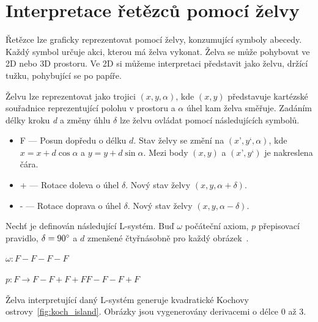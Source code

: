 \documentclass[thesis=M,czech]{FITthesis}[2019/12/23]
\begin{document}
\section{Interpretace řetězců pomocí želvy}
Řetězce lze graficky reprezentovat pomocí želvy, konzumující symboly abecedy. Každý symbol určuje akci, kterou má želva vykonat. Želva se může pohybovat ve 2D nebo 3D prostoru. Ve 2D si můžeme interpretaci představit jako želvu, držící tužku, pohybující se po papíře.

Želvu lze reprezentovat jako trojici $(x, y, \alpha)$, kde $(x, y)$ představuje kartézské souřadnice reprezentující polohu v prostoru a $\alpha$ úhel kam želva směřuje. Zadáním délky kroku \textit{d} a změny úhlu $\delta$ lze želvu ovládat pomocí následujících symbolů.

\begin{itemize}
\item F --- Posun dopředu o délku $d$. Stav želvy se změní na $(x’, y‘, \alpha)$, kde $x = x + d \cos \alpha$ a $y = y + d \sin \alpha$. Mezi body $(x, y)$ a $(x’, y‘)$ je nakreslena čára.
\item + --- Rotace doleva o úhel $\delta$. Nový stav želvy $(x, y, \alpha + \delta)$.
\item - --- Rotace doprava o úhel $\delta$. Nový stav želvy $(x, y, \alpha - \delta)$.
\end{itemize}

Nechť je definován následující L-systém. Buď $\omega$ počáteční axiom, $p$ přepisovací pravidlo, $\delta = 90\degree$ a $d$ zmenšené čtyřnásobně pro každý obrázek~\cite{abop7}.

\bigskip
$\omega: F-F-F-F$

\medskip
$p: F \rightarrow F-F+F+FF-F-F+F$

\bigskip
Želva interpretující daný L-systém generuje kvadratické Kochovy ostrovy~\ref{fig:koch_island}. Obrázky jsou vygenerovány derivacemi o délce 0 až 3.
\end{document}
